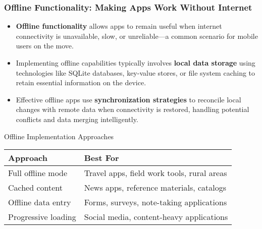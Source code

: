 \documentclass{beamer}
\begin{document}
	\begin{frame}
		\frametitle{Offline Functionality: Making Apps Work Without Internet}
		
		\begin{itemize}
			\item \textbf{Offline functionality} allows apps to remain useful when internet connectivity is unavailable, slow, or unreliable—a common scenario for mobile users on the move.
			\item Implementing offline capabilities typically involves \textbf{local data storage} using technologies like SQLite databases, key-value stores, or file system caching to retain essential information on the device.
			\item Effective offline apps use \textbf{synchronization strategies} to reconcile local changes with remote data when connectivity is restored, handling potential conflicts and data merging intelligently.
		\end{itemize}
		
		\begin{block}{\scriptsize{Offline Implementation Approaches}}
			\scriptsize{
				\begin{tabular}{|p{2.5cm}|p{5.5cm}|}
					\hline
					\textbf{Approach} & \textbf{Best For} \\
					\hline
					Full offline mode & Travel apps, field work tools, rural areas \\
					\hline
					Cached content & News apps, reference materials, catalogs \\
					\hline
					Offline data entry & Forms, surveys, note-taking applications \\
					\hline
					Progressive loading & Social media, content-heavy applications \\
					\hline
				\end{tabular}
			}
		\end{block}
		
	\end{frame}
	
\end{document}
